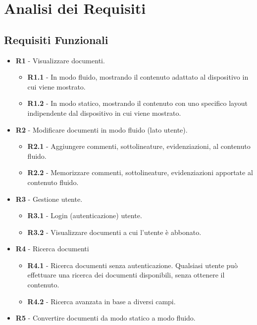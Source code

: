 
\section{Analisi dei Requisiti}
\subsection{Requisiti Funzionali}
\begin{itemize}
    \item \textbf{R1} - Visualizzare documenti.
    \begin{itemize}
        \item \textbf{R1.1} - In modo fluido, mostrando il contenuto adattato al dispositivo in cui viene mostrato.
        \item \textbf{R1.2} - In modo statico, mostrando il contenuto con uno specifico layout indipendente dal dispositivo in cui viene mostrato.
    \end{itemize}
    \item \textbf{R2} - Modificare documenti in modo fluido (lato utente).
    \begin{itemize}
        \item \textbf{R2.1} - Aggiungere commenti, sottolineature, evidenziazioni, al contenuto fluido.
        \item \textbf{R2.2} - Memorizzare commenti, sottolineature, evidenziazioni apportate al contenuto fluido.
    \end{itemize}
    \item \textbf{R3} - Gestione utente.
    \begin{itemize}
        \item \textbf{R3.1} - Login (autenticazione) utente.
        \item \textbf{R3.2} - Visualizzare documenti a cui l'utente è abbonato.
    \end{itemize}
    \item \textbf{R4} - Ricerca documenti
    \begin{itemize}
        \item \textbf{R4.1} - Ricerca documenti senza autenticazione. Qualsiasi utente può effettuare una ricerca dei documenti disponibili, senza ottenere il contenuto.
        \item \textbf{R4.2} - Ricerca avanzata in base a diversi campi. %
    \end{itemize}
    \item \textbf{R5} - Convertire documenti da modo statico a modo fluido.

\end{itemize}
